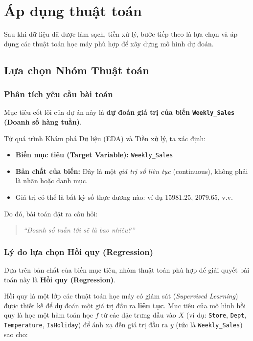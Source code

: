 \section{Áp dụng thuật toán}

Sau khi dữ liệu đã được làm sạch, tiền xử lý, bước tiếp theo là lựa chọn và áp dụng các thuật toán học máy phù hợp để xây dựng mô hình dự đoán.

\subsection{Lựa chọn Nhóm Thuật toán}

\subsubsection{Phân tích yêu cầu bài toán}

Mục tiêu cốt lõi của dự án này là \textbf{dự đoán giá trị của biến \texttt{Weekly\_Sales} (Doanh số hàng tuần)}.  

Từ quá trình Khám phá Dữ liệu (EDA) và Tiền xử lý, ta xác định:

\begin{itemize}
    \item \textbf{Biến mục tiêu (Target Variable):} \texttt{Weekly\_Sales}
    \item \textbf{Bản chất của biến:} Đây là một \textit{giá trị số liên tục} (continuous), không phải là nhãn hoặc danh mục.
    \item Giá trị có thể là bất kỳ số thực dương nào: ví dụ $15981.25$, $2079.65$, v.v.
\end{itemize}

Do đó, bài toán đặt ra câu hỏi:

\begin{quote}
\textit{“Doanh số tuần tới sẽ là bao nhiêu?”}
\end{quote}

\subsubsection{Lý do lựa chọn Hồi quy (Regression)}

Dựa trên bản chất của biến mục tiêu, nhóm thuật toán phù hợp để giải quyết bài toán này là \textbf{Hồi quy (Regression)}.  

Hồi quy là một lớp các thuật toán học máy có giám sát (\textit{Supervised Learning}) được thiết kế để dự đoán một giá trị đầu ra \textbf{liên tục}.  
Mục tiêu của mô hình hồi quy là học một hàm toán học $f$ từ các đặc trưng đầu vào $X$ (ví dụ: \texttt{Store}, \texttt{Dept}, \texttt{Temperature}, \texttt{IsHoliday}) để ánh xạ đến giá trị đầu ra $y$ (tức là \texttt{Weekly\_Sales}) sao cho:

